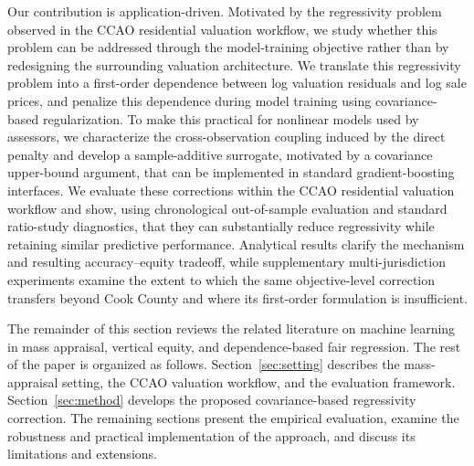 \documentclass[10pt]{article}
\theoremstyle{definition}
\newcommand{\1}{\mathbf{1}}
\begin{document}

Our contribution is application-driven. Motivated by the regressivity problem observed in the CCAO residential valuation workflow, we study whether this problem can be addressed through the model-training objective rather than by redesigning the surrounding valuation architecture. We translate this regressivity problem into a first-order dependence between log valuation residuals and log sale prices, and penalize this dependence during model training using covariance-based regularization. To make this practical for nonlinear models used by assessors, we characterize the cross-observation coupling induced by the direct penalty and develop a sample-additive surrogate, motivated by a covariance upper-bound argument, that can be implemented in standard gradient-boosting interfaces. We evaluate these corrections  within the CCAO residential valuation workflow and show, using chronological out-of-sample evaluation and standard ratio-study diagnostics, that they can substantially reduce regressivity while retaining similar predictive performance. Analytical results clarify the mechanism and resulting accuracy--equity tradeoff, while supplementary multi-jurisdiction experiments examine the extent to which the same objective-level correction transfers beyond Cook County and where its first-order formulation is insufficient.


{The remainder of this section reviews the related literature on machine learning in mass appraisal, vertical equity, and dependence-based fair regression. The rest of the paper is organized as follows.} Section~\ref{sec:setting} describes the mass-appraisal setting, the CCAO valuation workflow, and the evaluation framework. Section~\ref{sec:method} develops the proposed covariance-based regressivity correction. The remaining sections present the empirical evaluation, examine the robustness and practical implementation of the approach, and discuss its limitations and extensions.
\end{document}
